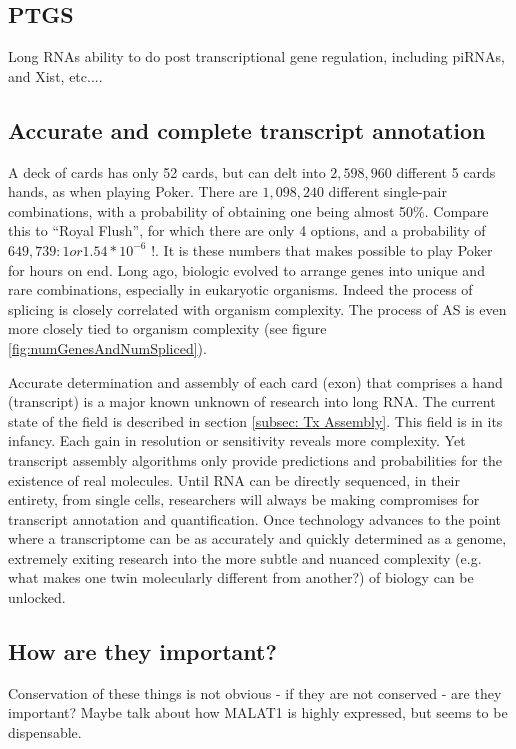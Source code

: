   \subsection{PTGS}
    Long RNAs ability to do post transcriptional gene regulation, including piRNAs, and Xist, etc....

  \subsection{Accurate and complete transcript annotation}
    A deck of cards has only 52 cards, but can delt into $2,598,960$ different 5 cards hands, as when playing Poker. There are $1,098,240$ different single-pair combinations, with a probability of obtaining one being almost 50\%. Compare this to ``Royal Flush'', for which there are only 4 options, and a probability of $649,739:1 or 1.54 * 10^{-6}$ !. It is these numbers that makes possible to play Poker for hours on end. Long ago, biologic evolved to arrange genes into unique and rare combinations, especially in eukaryotic organisms. Indeed the process of splicing is closely correlated with organism complexity. The process of AS is even more closely tied to organism complexity (see figure \ref{fig:numGenesAndNumSpliced}).

   Accurate determination and assembly of each card (exon) that comprises a hand (transcript) is a major known unknown of research into long RNA. The current state of the field is described in section \ref{subsec: Tx Assembly}. This field is in its infancy. Each gain in resolution or sensitivity reveals more complexity. Yet transcript assembly algorithms only provide predictions and probabilities for the existence of real molecules. Until RNA can be directly sequenced, in their entirety, from single cells, researchers will always be making compromises for transcript annotation and quantification. Once technology advances to the point where a transcriptome can be as accurately and quickly determined as a genome, extremely exiting research into the more subtle and nuanced complexity (e.g. what makes one twin molecularly different from another?) of biology can be unlocked.

  \subsection{How are they important?}
    Conservation of these things is not obvious - if they are not conserved - are they important? Maybe talk about how MALAT1 is highly expressed, but seems to be dispensable.


